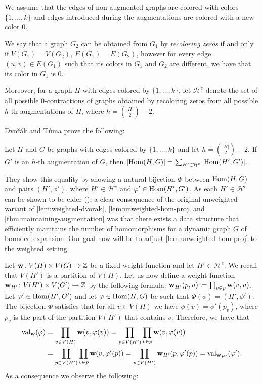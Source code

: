 We assume that the edges of non-augmented graphs are colored with colors $\{1, \ldots, k\}$ and edges introduced during the augmentations are colored with a new color $0$.

We say that a graph $G_2$ can be obtained from $G_1$ by \emph{recoloring zeros} if and only if $V(G_1) = V(G_2)$, $E(G_1) = E(G_2)$, however for every edge $(u, v) \in E(G_1)$ such that its colors in $G_1$ and $G_2$ are different, we have that its color in $G_1$ is $0$.

Moreover, for a graph $H$ with edges colored by $\{1, \ldots, k\}$, let $\mathcal{H}^e$ denote the set of all possible $0$-contractions of graphs obtained by recoloring zeros from all possible $h$-th augmentations of $H$, where $h = {|H| \choose 2} - 2$.%

Dvo\v{r}\'ak and T\r{u}ma prove the following:

\begin{lemma} \label{lem:unweighted-hom-proj}
	Let $H$ and $G$ be graphs with edges colored by $\{1, \ldots, k\}$ and let $h = {|H| \choose 2} - 2$. If $G'$ is an $h$-th augmentation of $G$, then $|\mathrm{Hom}(H, G)| = \sum_{H' \in \mathcal{H}^e} |\mathrm{Hom}(H', G')|$.
\end{lemma}

They show this equality by showing a natural bijection $\Phi$ between $\mathrm{Hom}(H, G)$ and pairs $(H', \phi')$, where $H' \in \mathcal{H}^e$ and $\varphi' \in \mathrm{Hom}(H', G')$. As each $H' \in \mathcal{H}^e$ can be shown to be elder (\cite[Lemma 12]{DvorakTumaArxiv}), a clear consequence of the original unweighted variant of \cref{lem:weighted-dvorak}, \cref{lem:unweighted-hom-proj} and \cref{thm:maintaining-augmentation} was that there exists a data structure that efficiently maintains the number of homomorphisms for a dynamic graph $G$ of bounded expansion. Our goal now will be to adjust \cref{lem:unweighted-hom-proj} to the weighted setting.

Let $\mathbf{w}\colon V(H) \times V(G) \to \mathbb{Z}$ be a fixed weight function and let $H' \in \mathcal{H}^e$. We recall that $V(H')$ is a partition of $V(H)$. Let us now define a weight function $\mathbf{w}_{H'} \colon V(H') \times V(G') \to \mathbb{Z}$ by the following formula: $\mathbf{w}_{H'}(p, u) \coloneqq \prod_{v \in p} \mathbf{w}(v, u)$. Let $\varphi' \in \mathrm{Hom}(H', G')$ and let $\varphi \in \mathrm{Hom}(H, G)$ be such that $\Phi(\phi) = (H', \phi')$. The bijection $\Phi$ satisfies that for all $v\in V(H)$ we have $\phi(v) = \phi'(p_v)$, where $p_v$ is the part of the partition $V(H')$ that contains $v$.
Therefore, we have that \begin{align*}\mathrm{val}_{\mathbf{w}}(\varphi) & = \prod_{v \in V(H)} \mathbf{w}(v, \varphi(v)) = \prod_{p \in V(H')} \prod_{v \in p} \mathbf{w}(v, \varphi(v))\\ &= \prod_{p \in V(H')} \prod_{v \in p} \mathbf{w}(v, \varphi'(p)) = \prod_{p \in V(H')} \mathbf{w}_{H'}(p, \varphi'(p)) = \mathrm{val}_{\mathbf{w}_{H'}}(\varphi').
	\end{align*} As a consequence we observe the following:

